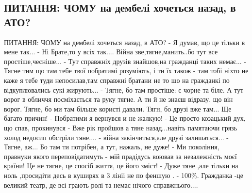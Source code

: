  
 


\subsection{ПИТАННЯ: ЧОМУ на дембелі хочеться назад, в АТО? }

ПИТАННЯ: ЧОМУ на дембелі хочеться назад, в АТО? 
- Я думав, що це тільки в мене так... 
- Ні Брате,то у всіх так.... Війна зве,тягне,манить..бо тут все простіше,чесніше... 
- Тут справжніх друзів знайшов,на гражданці таких немає... 
- Тягне тим що там тебе твої побратимі розуміють, і ти їх також 
- там тобі ніхто не каже я тебе туди непосилав,там справжні братани не то шо на гражданкі по відкуплювались сукі жирують... 
- Тягне, бо там простіше: є чорне та біле. А тут ворог в обличчя посміхається та руку тягне. А ти й не знаєш відразу, що він ворог. Тягне, бо ми там більше користі давали. Тягн, бо друзі вже там... Ще багато причин! 
- Побратими я вернувся и не жалкую! 
- Це просто козацький дух, що спав, прокинувся 
- Вже рік пройшов а тяне назад...навіть памятаючи грязь холод недосип обстріли тяне.... 
- війна закінчиться,але друзі залишаться... 
- Тягне, аж... Бо там ти потрібен, а тут, нажаль, не дуже! 
- Ми покоління, правнуки якого переповідатимуть - мій прадідусь воював за незалежність моєї країни! Це не тягне, це спосіб життя, це його зміст! 
- Дуже тяне ,але тільки на ноль ,просидіти десь в куширях в 3 лініі не по феншую . 
- 100\%. Гражданка -це великий театр, де всі грають ролі та немає нічого справжнього....
